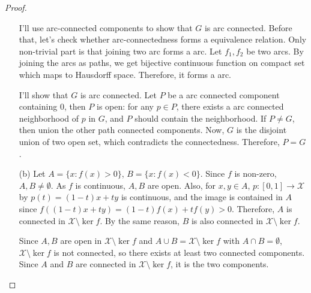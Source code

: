 \documentclass[a4paper, 12pt]{article}
\theoremstyle{Mydefinition}
\theoremstyle{Mytheorem}
\begin{document}
\begin{proof}
\begin{enumerate}
    I'll use arc-connected components to show that $G$ is arc connected. Before that, let's check whether arc-connectedness forms a equivalence relation. Only non-trivial part is that joining two arc forms a arc. Let $f_1,f_2$ be two arcs. By joining the arcs as paths, we get bijective continuous function on compact set which maps to Hausdorff space. Therefore, it forms a arc.
    
    I'll show that $G$ is arc connected. Let $P$ be a arc connected component containing $0$, then $P$ is open: for any $p\in P$, there exists a arc connected neighborhood of $p$ in $G$, and $P$ should contain the neighborhood. If $P\neq G$, then union the other path connected components. Now, $G$ is the disjoint union of two open set, which contradicts the connectedness. Therefore, $P=G$.
    \item[(b)] Let $A=\{x:f(x)>0\}$, $B=\{x:f(x)<0\}$. Since $f$ is non-zero, $A,B\neq \emptyset$. As $f$ is continuous, $A,B$ are open. Also, for $x,y\in A$, $p:[0,1]\rightarrow \mathscr{X}$ by $p(t)=(1-t)x+ty$ is continuous, and the image is contained in $A$ since $f((1-t)x+ty)=(1-t)f(x)+tf(y)>0$. Therefore, $A$ is connected in $\mathscr{X}\setminus \ker f$. By the same reason, $B$ is also connected in $\mathscr{X}\setminus \ker f$.
    
    Since $A,B$ are open in $\mathscr{X}\setminus \ker f$ and $A\cup B = \mathscr{X}\setminus \ker f$ with $A\cap B=\emptyset$, $\mathscr{X}\setminus \ker f$ is not connected, so there exists at least two connected components. Since $A$ and $B$ are connected in $\mathscr{X}\setminus \ker f$, it is the two components.
\end{enumerate}
\end{proof}
\end{document}
